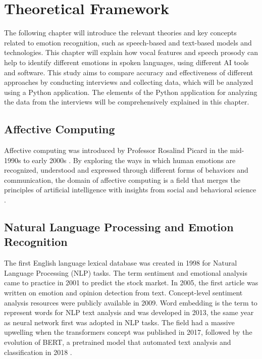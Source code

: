 \chapter{Theoretical Framework}
\label{chap:theoretical-framework}

The following chapter will introduce the relevant theories and key concepts related to emotion recognition, such as speech-based and text-based models and technologies. 
This chapter will explain how vocal features and speech prosody can help to identify different emotions in spoken languages, using different AI tools and software. This study aims to compare accuracy and effectiveness of different approaches by conducting interviews and collecting data, which will be analyzed using a Python application. The elements of the Python application for analyzing the data from the interviews will be comprehensively explained in this chapter.

\section{Affective Computing}

 Affective computing was introduced by Professor Rosalind Picard in the mid-1990s to early 2000s \autocite{Tian2022}. By exploring the ways in which human emotions are recognized, understood and expressed through different forms of behaviors and communication, the domain of affective computing is a field that merges the principles of artificial intelligence with insights from social and behavioral science \autocite{Tian2022}.

\section{Natural Language Processing and Emotion Recognition}

 The first English language lexical database was created in 1998 \autocite{Kusal2023} for Natural Language Processing (NLP) tasks. The term sentiment and emotional analysis came to practice in 2001 \autocite{Kusal2023} to predict the stock market. In 2005, the first article was written on emotion and opinion detection from text. Concept-level sentiment analysis resources were publicly available in 2009. Word embedding is the term to represent words for NLP text analysis and was developed in 2013, the same year as neural network first was adopted in NLP tasks. The field had a massive upwelling when the transformers concept was published in 2017, followed by the evolution of BERT, a pretrained model that automated text analysis and classification in 2018 \autocite{Kusal2023}. 

